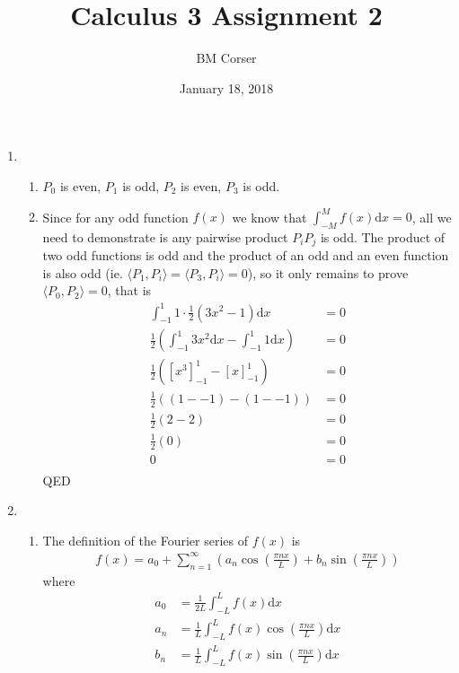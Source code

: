 \documentclass[10pt]{article}
\author{BM Corser}
\title{Calculus 3 Assignment 2}
\date{January 18, 2018}
\begin{document}
  \maketitle
  \begin{enumerate}
    \item
    \begin{enumerate}
      \item $P_0$ is even, $P_1$ is odd, $P_2$ is even, $P_3$ is odd.
      \item Since for any odd function $f(x)$ we know that
        $\int^M_{-M}f(x)\text{d}x = 0$, all we need to demonstrate is any
        pairwise product $P_iP_j$ is odd. The product of two odd functions is
        odd and the product of an odd and an even function is also odd (ie.
        $\langle P_1, P_i\rangle = \langle P_3, P_i\rangle = 0$), so it only
        remains to prove $\langle P_0, P_2 \rangle = 0$, that is
        \begin{align*}
          \int^1_{-1}1\cdot\frac{1}{2}(3x^2 - 1)\text{d}x &= 0 \\
          \frac{1}{2}\left(\int^1_{-1}3x^2\text{d}x - \int^1_{-1}1\text{d}x\right) &= 0 \\
          \frac{1}{2}\left([x^3]^1_{-1} - [x]^1_{-1}\right) &= 0 \\
          \frac{1}{2}\left((1 -- 1)  - (1 -- 1)\right) &= 0 \\
          \frac{1}{2}\left(2 - 2\right) &= 0 \\
          \frac{1}{2}\left(0\right) &= 0 \\
          0 &= 0 \\
        \end{align*}
        QED
    \end{enumerate}
      \pagebreak
    \item
    \begin{enumerate}
      \item
        The definition of the Fourier series of $f(x)$ is
        \begin{align*}
          f(x) = a_0 + \sum^\infty_{n=1}\left(a_n\cos(\tfrac{\pi nx}{L}) + b_n\sin(\tfrac{\pi nx}{L})\right)
        \end{align*}
        where
        \begin{align*}
          a_0 &= \frac{1}{2L}\int^L_{-L}f(x)\text{d}x \\
          a_n &= \frac{1}{L}\int^L_{-L}f(x)\cos(\tfrac{\pi nx}{L})\text{d}x \\
          b_n &= \frac{1}{L}\int^L_{-L}f(x)\sin(\tfrac{\pi nx}{L})\text{d}x

\end{align*}
\end{enumerate}
\end{enumerate}
\end{document}
